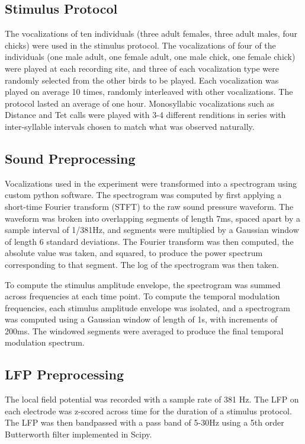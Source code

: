 \subsection{Stimulus Protocol}

    The vocalizations of ten individuals (three adult females, three adult males, four chicks) were used in the stimulus protocol. The vocalizations of four of the individuals (one male adult, one female adult, one male chick, one female chick) were played at each recording site, and three of each vocalization type were randomly selected from the other birds to be played. Each vocalization was played on average 10 times, randomly interleaved with other vocalizations. The protocol lasted an average of one hour. Monosyllabic vocalizations such as Distance and Tet calls were played with 3-4 different renditions in series with inter-syllable intervals chosen to match what was observed naturally.

\subsection{Sound Preprocessing}

Vocalizations used in the experiment were transformed into a spectrogram using custom python software. The spectrogram was computed by first applying a short-time Fourier transform (STFT) to the raw sound pressure waveform. The waveform was broken into overlapping segments of length 7ms, spaced apart by a sample interval of 1/381Hz, and segments were multiplied by a Gaussian window of length 6 standard deviations. The Fourier transform was then computed, the absolute value was taken, and squared, to produce the power spectrum corresponding to that segment. The log of the spectrogram was then taken.

To compute the stimulus amplitude envelope, the spectrogram was summed across frequencies at each time point. To compute the temporal modulation frequencies, each stimulus amplitude envelope was isolated, and a spectrogram was computed using a Gaussian window of length of 1s, with increments of 200ms. The windowed segments were averaged to produce the final temporal modulation spectrum.

\subsection{LFP Preprocessing}

The local field potential was recorded with a sample rate of 381 Hz. The LFP on each electrode was z-scored across time for the duration of a stimulus protocol. The LFP was then bandpassed with a pass band of 5-30Hz using a 5th order Butterworth filter implemented in Scipy.

